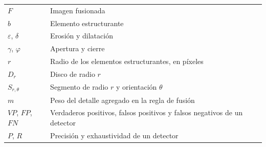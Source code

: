 {\begin{longtable}{@{}>{\raggedleft\arraybackslash}p{}p{}@{}}
$F$    & Imagen fusionada \\
$b$    & Elemento estructurante \\
$\varepsilon$, $\delta$ & Erosión y dilatación \\
$\gamma$, $\varphi$ & Apertura y cierre \\
$r$    & Radio de los elementos estructurantes, en píxeles \\
$D_r$  & Disco de radio $r$ \\
$S_{r,\theta}$ & Segmento de radio $r$ y orientación $\theta$ \\
$m$    & Peso del detalle agregado en la regla de fusión \\
$\mathit{VP}$, $\mathit{FP}$, $\mathit{FN}$ & Verdaderos positivos, falsos positivos y falsos negativos de un detector \\
$P$, $R$ & Precisión y exhaustividad de un detector \\
\end{longtable}
\addtocounter{table}{-1}}
